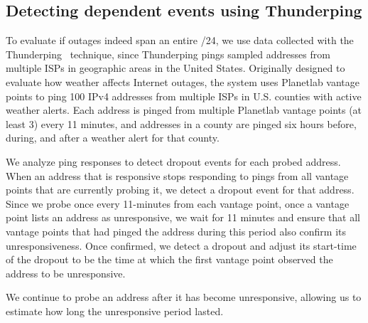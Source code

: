 \subsection{Detecting dependent events using Thunderping}

To evaluate if outages indeed span an entire /24, we use data collected with the
Thunderping~\cite{schulman-imc11} technique, since Thunderping pings
sampled addresses from multiple ISPs in geographic areas in the United
States. Originally designed to evaluate how weather affects Internet
outages, the system uses Planetlab vantage points to ping 100 IPv4
addresses from multiple ISPs in U.S. counties with active
weather alerts. Each address is pinged from multiple Planetlab vantage
points (at least 3) every 11 minutes, and addresses in a county are
pinged six hours before, during, and after a weather alert for that
county. 

We analyze ping responses to detect dropout events for each probed
address. When an address that is responsive stops responding to pings
from all vantage points that are currently probing it, we detect a
dropout event for that address. Since we probe once every 11-minutes
from each vantage point, 
once a vantage point lists an address as unresponsive, we wait for 11 minutes and ensure that
all vantage points that had pinged the address during this period also
confirm its unresponsiveness. Once confirmed, we detect a dropout and
adjust its start-time of the dropout to be the time at which the first
vantage point observed the address to be unresponsive. 

We continue to probe an address after it has become unresponsive,
allowing us to estimate how long the unresponsive period lasted.



